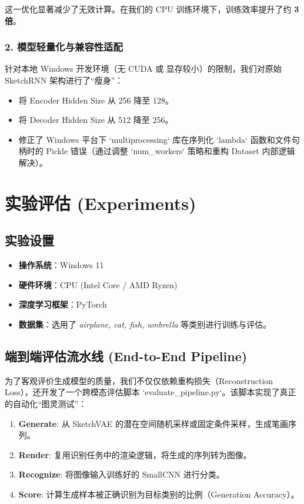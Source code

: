 \documentclass{sjtuarticle}
\begin{document}
这一优化显著减少了无效计算。在我们的 CPU 训练环境下，训练效率提升了约 \textbf{3倍}。

\subsubsection{2. 模型轻量化与兼容性适配}
针对本地 Windows 开发环境（无 CUDA 或 显存较小）的限制，我们对原始 SketchRNN 架构进行了“瘦身”：
\begin{itemize}
    \item 将 Encoder Hidden Size 从 256 降至 128。
    \item 将 Decoder Hidden Size 从 512 降至 256。
    \item 修正了 Windows 平台下 `multiprocessing` 库在序列化 `lambda` 函数和文件句柄时的 Pickle 错误（通过调整 `num_workers` 策略和重构 Dataset 内部逻辑解决）。
\end{itemize}

\section{实验评估 (Experiments)}

\subsection{实验设置}
\begin{itemize}
    \item \textbf{操作系统}：Windows 11
    \item \textbf{硬件环境}：CPU (Intel Core / AMD Ryzen)
    \item \textbf{深度学习框架}：PyTorch
    \item \textbf{数据集}：选用了 \textit{airplane, cat, fish, umbrella} 等类别进行训练与评估。
\end{itemize}

\subsection{端到端评估流水线 (End-to-End Pipeline)}
为了客观评价生成模型的质量，我们不仅仅依赖重构损失（Reconstruction Loss），还开发了一个跨模态评估脚本 `evaluate\_pipeline.py`。该脚本实现了真正的自动化“图灵测试”：
\begin{enumerate}
    \item \textbf{Generate}: 从 SketchVAE 的潜在空间随机采样或固定条件采样，生成笔画序列。
    \item \textbf{Render}: 复用识别任务中的渲染逻辑，将生成的序列转为图像。
    \item \textbf{Recognize}: 将图像输入训练好的 SmallCNN 进行分类。
    \item \textbf{Score}: 计算生成样本被正确识别为目标类别的比例（Generation Accuracy）。
\end{enumerate}
\end{document}
